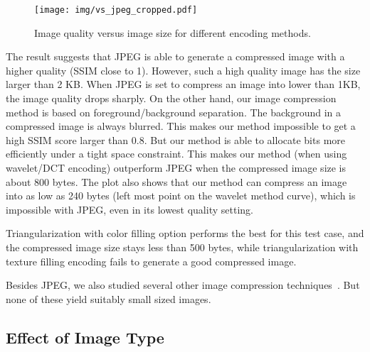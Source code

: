 \begin{figure}[!htb]
	\begin{center}
		\texttt{[image: img/vs\_jpeg\_cropped.pdf]}
		\caption{Image quality versus image size for different encoding methods.}
		\label{fig:vs_jpeg}
	\end{center}
\end{figure}

The result suggests that JPEG is able to generate a compressed image with a higher quality (SSIM close to 1). However, such a high quality image has the size larger than 2 KB. When JPEG is set to compress an image into lower than 1KB, the image quality drops sharply. On the other hand, our image compression method is based on foreground/background separation. The background in a compressed image is always blurred. This makes our method impossible to get a high SSIM score larger than 0.8. But our method is able to allocate bits more efficiently under a tight space constraint. This makes our method (when using wavelet/DCT encoding) outperform JPEG when the compressed image size is about 800 bytes. The plot also shows that our method can compress an image into as low as 240 bytes (left most point on the wavelet method curve), which is impossible with JPEG, even in its lowest quality setting.

Triangularization with color filling option performs the best for this test case, and the compressed image size stays less than 500 bytes, while triangularization with texture filling encoding fails to generate a good compressed image.

Besides JPEG, we also studied several other image compression techniques~\cite{mohamed1995binary}\cite{zahir2007new}\cite{zahir2005new}. But none of these yield suitably small sized images.



\subsection{Effect of Image Type}

